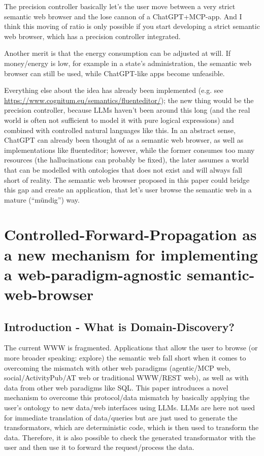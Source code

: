 \documentclass[12pt,a4paper]{article}
\begin{document}
The precision controller basically let's the user move between a very strict semantic web browser and the lose cannon of a ChatGPT+MCP-app. And I think this moving of ratio is only possible if you start developing a strict semantic web browser, which has a precision controller integrated.

Another merit is that the energy consumption can be adjusted at will. If money/energy is low, for example in a state's administration, the semantic web browser can still be used, while ChatGPT-like apps become unfeasible.

Everything else about the idea has already been implemented (e.g. see \url{https://www.cognitum.eu/semantics/fluenteditor/}); the new thing would be the precision controller, because LLMs haven't been around this long (and the real world is often not sufficient to model it with pure logical expressions) and combined with controlled natural languages like this. In an abstract sense, ChatGPT can already been thought of as a semantic web browser, as well as implementations like fluenteditor; however, while the former consumes too many resources (the hallucinations can probably be fixed), the later assumes a world that can be modelled with ontologies that does not exist and will always fall short of reality. The semantic web browser proposed in this paper could bridge this gap and create an application, that let's user browse the semantic web in a mature (``mündig'') way.

\newpage

\section{Controlled-Forward-Propagation as a new mechanism for implementing a web-paradigm-agnostic semantic-web-browser}

\subsection{Introduction - What is Domain-Discovery?}

The current WWW is fragmented. Applications that allow the user to browse (or more broader speaking: explore) the semantic web fall short when it comes to overcoming the mismatch with other web paradigms (agentic/MCP web, social/ActivityPub/AT web or traditional WWW/REST web), as well as with data from other web paradigms like SQL. This paper introduces a novel mechanism to overcome this protocol/data mismatch by basically applying the user's ontology to new data/web interfaces using LLMs. LLMs are here not used for immediate translation of data/queries but are just used to generate the transformators, which are deterministic code, which is then used to transform the data. Therefore, it is also possible to check the generated transformator with the user and then use it to forward the request/process the data.
\end{document}
